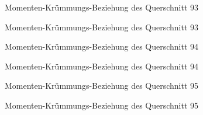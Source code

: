 \documentclass[
  11pt,
  letterpaper,
]{scrreprt}
\begin{document}
\begin{figure}[H]


\caption{\label{fig-qs_93}Momenten-Krümmungs-Beziehung des Querschnitt
93}

\end{figure}%

\begin{figure}[H]


\caption{\label{fig-m_chi_93}Momenten-Krümmungs-Beziehung des
Querschnitt 93}

\end{figure}%

\begin{figure}[H]


\caption{\label{fig-qs_94}Momenten-Krümmungs-Beziehung des Querschnitt
94}

\end{figure}%

\begin{figure}[H]


\caption{\label{fig-m_chi_94}Momenten-Krümmungs-Beziehung des
Querschnitt 94}

\end{figure}%

\begin{figure}[H]


\caption{\label{fig-qs_95}Momenten-Krümmungs-Beziehung des Querschnitt
95}

\end{figure}%

\begin{figure}[H]


\caption{\label{fig-m_chi_95}Momenten-Krümmungs-Beziehung des
Querschnitt 95}

\end{figure}%
\end{document}
